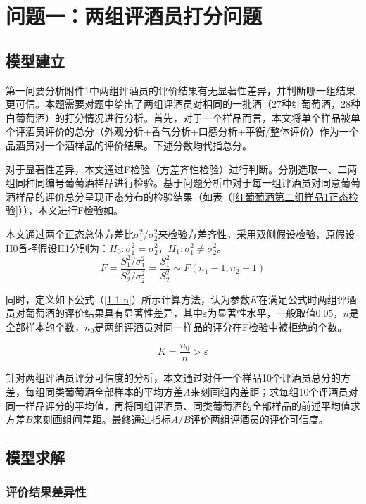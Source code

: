 \documentclass[withoutpreface,bwprint]{cumcmthesis} %
\begin{document}
\section{问题一：两组评酒员打分问题}

\subsection{模型建立}
第一问要分析附件1中两组评酒员的评价结果有无显著性差异，并判断哪一组结果更可信。本题需要对题中给出了两组评酒员对相同的一批酒（27种红葡萄酒，28种白葡萄酒）的打分情况进行分析。首先，对于一个样品而言，本文将单个样品被单个评酒员评价的总分（外观分析+香气分析+口感分析+平衡/整体评价）作为一个品酒员对一个酒样品的评价结果。下述分数均代指总分。

对于显著性差异，本文通过F检验（方差齐性检验）进行判断。分别选取一、二两组同种同编号葡萄酒样品进行检验。基于问题分析中对于每一组评酒员对同意葡萄酒样品的评价总分呈现正态分布的检验结果（如表（\ref{红葡萄酒第二组样品1正态检验}）），本文进行F检验如。

本文通过两个正态总体方差比$\sigma_1^2/\sigma_2^2$来检验方差齐性，采用双侧假设检验，原假设H0备择假设H1分别为：$H_0:\sigma_1^2= \sigma_2^2$，$H_1:\sigma_1^2 \neq \sigma_2^2$。
\begin{equation}
	\label{1-1-1}
	F = \frac{S_1^2/\sigma_1^2}{S_2^2/\sigma_2^2} = \frac{S_1^2}{S_2^2} \sim F(n_1 - 1, n_2 - 1)
\end{equation}

同时，定义如下公式（\ref{1-1-n}）所示计算方法，认为参数$K$在满足公式时两组评酒员对葡萄酒的评价结果具有显著性差异，其中$\varepsilon$为显著性水平，一般取值$0.05$，$n$是全部样本的个数，$n_0$是两组评酒员对同一样品的评分在F检验中被拒绝的个数。

\begin{equation}
\label{1-1-n}
	K = \frac{n_0}{n} > \varepsilon
\end{equation}

针对两组评酒员评分可信度的分析，本文通过对任一个样品10个评酒员总分的方差，每组同类葡萄酒全部样本的平均方差$A$来刻画组内差距；求每组10个评酒员对同一样品评分的平均值，再将同组评酒员、同类葡萄酒的全部样品的前述平均值求方差$B$来刻画组间差距。最终通过指标$A/B$评价两组评酒员的评价可信度。

\subsection{模型求解}
\subsubsection{评价结果差异性}
\end{document}
